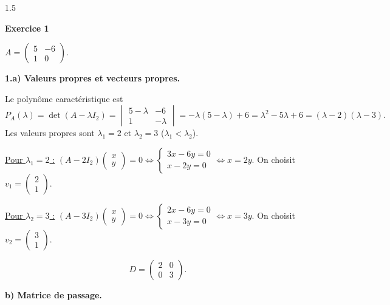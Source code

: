 \documentclass[12pt]{article}
\begin{document}
\begin{spacing}{1.5}

\textbf{Exercice 1}

$A=\begin{pmatrix}5&-6\\1&0\end{pmatrix}$.

\textbf{1.a) Valeurs propres et vecteurs propres.}

Le polynôme caractéristique est
\[
P_A(\lambda)=\det(A-\lambda I_2)=\begin{vmatrix}5-\lambda&-6\\1&-\lambda\end{vmatrix}=-\lambda(5-\lambda)+6=\lambda^2-5\lambda+6=(\lambda-2)(\lambda-3).
\]
Les valeurs propres sont $\lambda_1=2$ et $\lambda_2=3$ ($\lambda_1<\lambda_2$).

\underline{Pour $\lambda_1=2$ :} $(A-2I_2)\begin{pmatrix}x\\y\end{pmatrix}=0\iff\begin{cases}3x-6y=0\\x-2y=0\end{cases}\iff x=2y$. On choisit $v_1=\begin{pmatrix}2\\1\end{pmatrix}$.

\underline{Pour $\lambda_2=3$ :} $(A-3I_2)\begin{pmatrix}x\\y\end{pmatrix}=0\iff\begin{cases}2x-6y=0\\x-3y=0\end{cases}\iff x=3y$. On choisit $v_2=\begin{pmatrix}3\\1\end{pmatrix}$.

\[
D=\begin{pmatrix}2&0\\0&3\end{pmatrix}.
\]

\textbf{b) Matrice de passage.}


\end{spacing}
\end{document}
